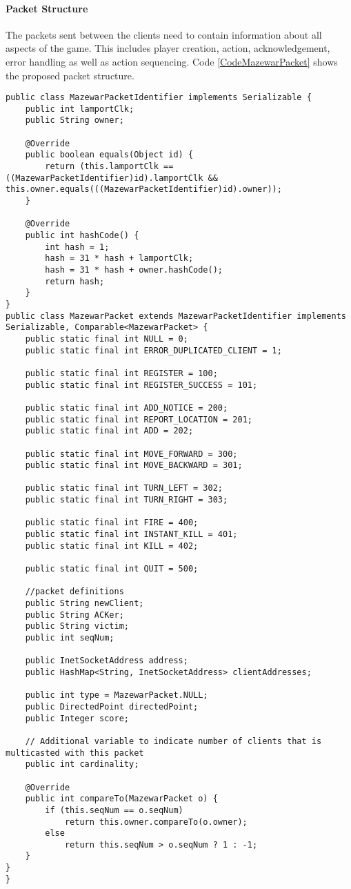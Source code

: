 \paragraph*{Packet Structure} The packets sent between the clients need to contain information about all aspects of the game. This includes player creation, action, acknowledgement, error handling as well as action sequencing. Code \ref{CodeMazewarPacket} shows the proposed packet structure. 
\newpage
{
\singlespacing
\begin{lstlisting}[caption = {[MazewarPacket.java]Structure of packets exchanged between players}, label = CodeMazewarPacket]
public class MazewarPacketIdentifier implements Serializable {
    public int lamportClk;
    public String owner;

    @Override
    public boolean equals(Object id) {
        return (this.lamportClk == ((MazewarPacketIdentifier)id).lamportClk && this.owner.equals(((MazewarPacketIdentifier)id).owner));
    }

    @Override
    public int hashCode() {
        int hash = 1;
        hash = 31 * hash + lamportClk;
        hash = 31 * hash + owner.hashCode();
        return hash;
    }
}
public class MazewarPacket extends MazewarPacketIdentifier implements Serializable, Comparable<MazewarPacket> {
    public static final int NULL = 0;
    public static final int ERROR_DUPLICATED_CLIENT = 1;

    public static final int REGISTER = 100;
    public static final int REGISTER_SUCCESS = 101;

    public static final int ADD_NOTICE = 200;
    public static final int REPORT_LOCATION = 201;
    public static final int ADD = 202;

    public static final int MOVE_FORWARD = 300;
    public static final int MOVE_BACKWARD = 301;

    public static final int TURN_LEFT = 302;
    public static final int TURN_RIGHT = 303;

    public static final int FIRE = 400;
    public static final int INSTANT_KILL = 401;
    public static final int KILL = 402;

    public static final int QUIT = 500;

    //packet definitions
    public String newClient;
    public String ACKer;
    public String victim;
    public int seqNum;

    public InetSocketAddress address;
    public HashMap<String, InetSocketAddress> clientAddresses;

    public int type = MazewarPacket.NULL;
    public DirectedPoint directedPoint;
    public Integer score;

    // Additional variable to indicate number of clients that is multicasted with this packet
    public int cardinality;

    @Override
    public int compareTo(MazewarPacket o) {
        if (this.seqNum == o.seqNum)
            return this.owner.compareTo(o.owner);
        else
            return this.seqNum > o.seqNum ? 1 : -1;
    }
}
}
\end{lstlisting}
}

